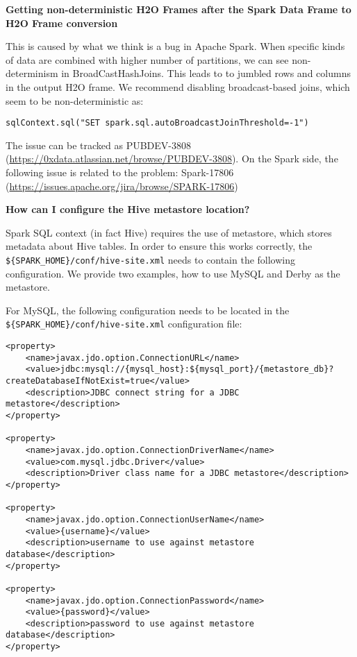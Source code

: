 \textbf{Getting non-deterministic H2O Frames after the Spark Data Frame to H2O Frame conversion}

This is caused by what we think is a bug in Apache Spark. When specific kinds of data are combined with higher number of
partitions, we can see non-determinism in BroadCastHashJoins. This leads to to jumbled rows and columns in the output H2O
frame. We recommend disabling broadcast-based joins, which seem to be non-deterministic as:

\begin{lstlisting}[style=Scala]
sqlContext.sql("SET spark.sql.autoBroadcastJoinThreshold=-1")
\end{lstlisting}

The issue can be tracked as PUBDEV-3808 (\url{https://0xdata.atlassian.net/browse/PUBDEV-3808}). On the Spark side, the
following issue is related to the problem: Spark-17806 (\url{https://issues.apache.org/jira/browse/SPARK-17806})

\textbf{How can I configure the Hive metastore location?}

Spark SQL context (in fact Hive) requires the use of metastore, which stores metadata about Hive tables. In order to
ensure this works correctly, the {\lstinline[style=Bash]|${SPARK_HOME}/conf/hive-site.xml|} needs to contain the following
configuration. We provide two examples, how to use MySQL and Derby as the metastore.

For MySQL, the following configuration needs to be located in the {\lstinline[style=Bash]|${SPARK_HOME}/conf/hive-site.xml|} configuration file:

\begin{lstlisting}[style=Bash]
<property>
    <name>javax.jdo.option.ConnectionURL</name>
    <value>jdbc:mysql://{mysql_host}:${mysql_port}/{metastore_db}?createDatabaseIfNotExist=true</value>
    <description>JDBC connect string for a JDBC metastore</description>
</property>

<property>
    <name>javax.jdo.option.ConnectionDriverName</name>
    <value>com.mysql.jdbc.Driver</value>
    <description>Driver class name for a JDBC metastore</description>
</property>

<property>
    <name>javax.jdo.option.ConnectionUserName</name>
    <value>{username}</value>
    <description>username to use against metastore database</description>
</property>

<property>
    <name>javax.jdo.option.ConnectionPassword</name>
    <value>{password}</value>
    <description>password to use against metastore database</description>
</property>
\end{lstlisting}


